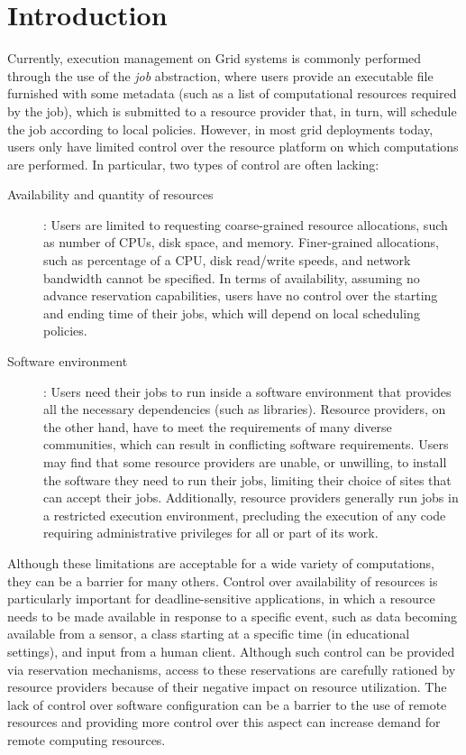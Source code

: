 \documentclass[singlespace]{ccw_chithesis}
\begin{document}
\tableofcontents
\listoffigures
\listoftables

\renewcommand{\chaptername}{Section}

\mainmatter

\chapter{Introduction}
\label{cha:introduction}
Currently, execution management on Grid systems is commonly performed through the use of the \emph{job} abstraction, where users provide an executable file furnished with some metadata (such as a list of computational resources required by the job), which is submitted to a resource provider that, in turn, will schedule the job according to local policies. However, in most grid deployments today, users only have limited control over the resource platform on which computations are performed. In particular, two types of control are often lacking:

\begin{description}
\item[Availability and quantity of resources]: Users are limited to requesting coarse-grained resource allocations, such as number of CPUs, disk space, and memory. Finer-grained allocations, such as percentage of a CPU, disk read/write speeds, and network bandwidth cannot be specified. In terms of availability, assuming no advance reservation capabilities, users have no control over the starting and ending time of their jobs, which will depend on local scheduling policies.
\item[Software environment]: Users need their jobs to run inside a software environment that provides all the necessary dependencies (such as libraries). Resource providers, on the other hand, have to meet the requirements of many diverse communities, which can result in conflicting software requirements. Users may find that some resource providers are unable, or unwilling, to install the software they need to run their jobs, limiting their choice of sites that can accept their jobs. Additionally, resource providers generally run jobs in a restricted execution environment, precluding the execution of any code requiring administrative privileges for all or part of its work.
\end{description}

Although these limitations are acceptable for a wide variety of computations, they can be a barrier for many others. Control over availability of resources is particularly important for deadline{}-sensitive applications, in which a resource needs to be made available in response to a specific event, such as data becoming available from a sensor, a class starting at a specific time (in educational settings), and input from a human client. Although such control can be provided via reservation mechanisms, access to these reservations are carefully rationed by resource providers because of their negative impact on resource utilization. The lack of control over software configuration can be a barrier to the use of remote resources and providing more control over this aspect can increase demand for remote computing resources.
\end{document}
